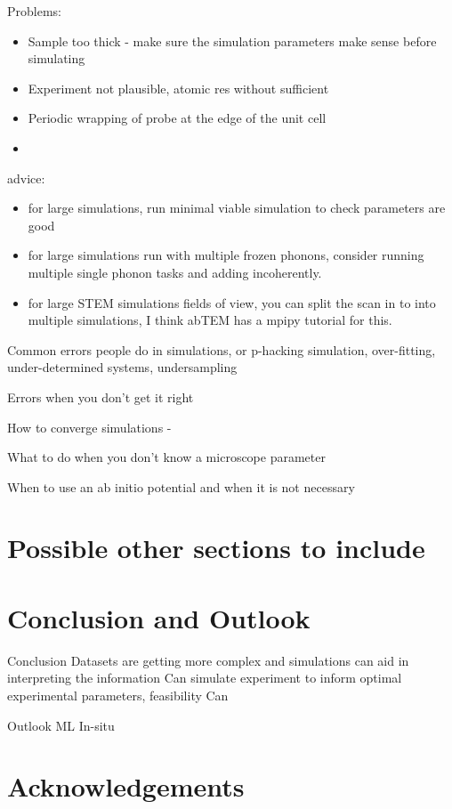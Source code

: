 \documentclass[%
 superscriptaddress,
 aip,
 amsmath,amssymb,
preprint,%
 author-year,%
longbibliography
]{revtex4-2}
\begin{document}
Problems:
\begin{itemize}
    \item Sample too thick - make sure the simulation parameters make sense before simulating 
    \item Experiment not plausible, atomic res without sufficient 
    \item Periodic wrapping of probe at the edge of the unit cell
    \item 
\end{itemize}
advice:
\begin{itemize}
    \item for large simulations, run minimal viable simulation to check parameters are good
    \item for large simulations run with multiple frozen phonons, consider running multiple single phonon tasks and adding incoherently. 
    \item for large STEM simulations fields of view, you can split the scan in to into multiple simulations, I think abTEM has a mpipy tutorial for this.   
\end{itemize}



Common errors people do in simulations, or p-hacking simulation, over-fitting, under-determined systems, undersampling



Errors when you don't get it right

How to converge simulations - 

What to do when you don't know a microscope parameter

When to use an ab initio potential and when it is not necessary


\section*{Possible other sections to include}



\section*{Conclusion and Outlook}


Conclusion 
Datasets are getting more complex and simulations can aid in interpreting the information 
Can simulate experiment to inform optimal experimental parameters, feasibility 
Can 

Outlook 
ML 
In-situ 


\section*{Acknowledgements}
\end{document}
